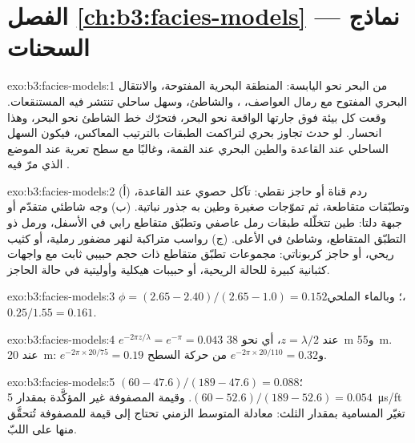 \section*{الفصل \ref{ch:b3:facies-models} --- نماذج السحنات}

\begin{solution}{exo:b3:facies-models:1}
من البحر نحو اليابسة: المنطقة البحرية المفتوحة، والانتقال البحري المفتوح مع رمال العواصف،
، والشاطئ، وسهل ساحلي تنتشر فيه المستنقعات. وقعت كل بيئة فوق جارتها الواقعة نحو البحر،
فتحرّك خط الشاطئ نحو البحر، وهذا انحسار. لو حدث تجاوز بحري لتراكمت
الطبقات بالترتيب المعاكس، فيكون السهل الساحلي عند القاعدة والطين البحري عند القمة،
وغالبًا مع سطح تعرية عند الموضع الذي
مرّ فيه .
\end{solution}

\begin{solution}{exo:b3:facies-models:2}
(أ) ردم قناة أو حاجز نقطي: تآكل حصوي عند القاعدة، وتطبّقات متقاطعة،
ثم تموّجات صغيرة وطين به جذور نباتية. (ب) وجه شاطئي متقدّم أو جبهة دلتا:
طين تتخلّله طبقات رمل عاصفي وتطبّق متقاطع رابي في الأسفل،
ورمل  ذو التطبّق المتقاطع، وشاطئ في الأعلى. (ج) رواسب متراكبة لنهر مضفور
رملية، أو كثيب ريحي، أو حاجز كربوناتي: مجموعات تطبّق متقاطع ذات حجم حبيبي ثابت
مع واجهات كثبانية كبيرة للحالة الريحية، أو حبيبات هيكلية وأوليتية
في حالة الحاجز.
\end{solution}

\begin{solution}{exo:b3:facies-models:3}
$\phi = (2.65 - 2.40)/(2.65 - 1.0) = 0.152$؛ وبالماء الملحي،
$0.25/1.55 = 0.161$.
\end{solution}

\begin{solution}{exo:b3:facies-models:4}
$e^{-2\pi z/\lambda} = e^{-\pi} = 0.043$ عند $z = \lambda/2$، أي نحو
\qty{38}{m} و\qty{55}{m}. عند \qty{20}{m}: $e^{-2\pi\times20/75} = 0.19$
و$e^{-2\pi\times20/110} = 0.32$ من حركة السطح.
\end{solution}

\begin{solution}{exo:b3:facies-models:5}
$(60 - 47.6)/(189 - 47.6) = 0.088$؛ $(60 - 52.6)/(189 - 52.6) = 0.054$. وقيمة
المصفوفة غير المؤكَّدة بمقدار \qty{5}{\micro\second/ft} تغيّر المسامية بمقدار الثلث:
معادلة المتوسط الزمني تحتاج إلى قيمة للمصفوفة تُتحقَّق منها على اللبّ.
\end{solution}

